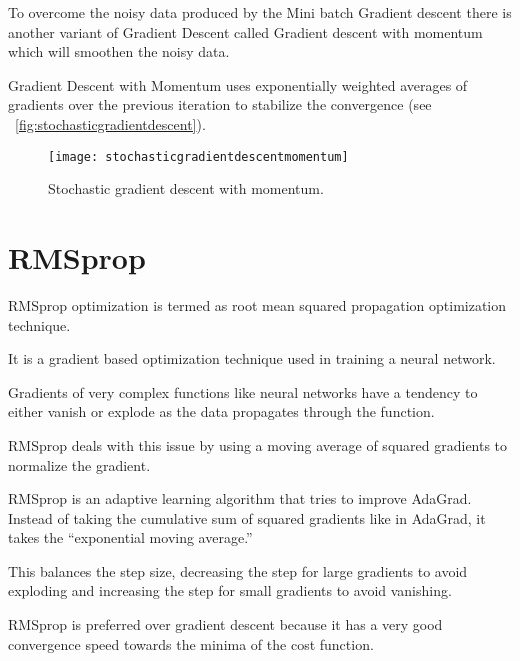 	\begin{bulletedlist}
		\item To overcome the noisy data produced by the Mini batch Gradient descent there is another variant of Gradient Descent called Gradient descent with momentum which will smoothen the noisy data.
		\item Gradient Descent with Momentum uses exponentially weighted averages of gradients over the previous iteration to stabilize the convergence (see \figurename~\ref{fig:stochasticgradientdescent}).
	\end{bulletedlist}
 	\begin{figure}[htb]
		\centering
		\texttt{[image: stochasticgradientdescentmomentum]}
		\caption[Stochastic gradient descent with momentum]{Stochastic gradient descent with momentum.}
		\label{fig:stochasticgradientdescentmomentum}
	\end{figure}


	\section{RMSprop}

	\begin{bulletedlist}
		\item RMSprop optimization is termed as root mean squared propagation optimization technique.
		\item It is a gradient based optimization technique used in training a neural network.
		\item Gradients of very complex functions like neural networks have a tendency to either vanish or explode as the data propagates through the function.
		\item RMSprop deals with this issue by using a moving average of squared gradients to normalize the gradient.
		\item RMSprop is an adaptive learning algorithm that tries to improve AdaGrad. Instead of taking the cumulative sum of squared gradients like in AdaGrad, it takes the ``exponential moving average.''
		\item This balances the step size, decreasing the step for large gradients to avoid exploding and increasing the step for small gradients to avoid vanishing.
		\item RMSprop is preferred over gradient descent because it has a very good convergence speed towards the minima of the cost function.
	\end{bulletedlist}

